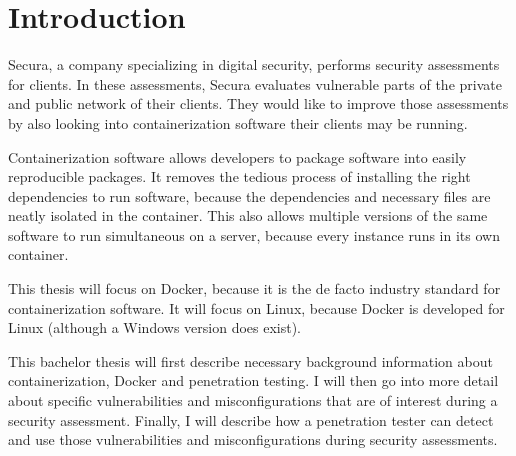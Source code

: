 \chapter{Introduction}
Secura, a company specializing in digital security, performs security assessments for clients. In these assessments, Secura evaluates vulnerable parts of the private and public network of their clients. They would like to improve those assessments by also looking into containerization software their clients may be running.

\hfill

Containerization software allows developers to package software into easily reproducible packages.
It removes the tedious process of installing the right dependencies to run software, because the dependencies and necessary files are neatly isolated in the container. This also allows multiple versions of the same software to run simultaneous on a server, because every instance runs in its own container.

\hfill

This thesis will focus on Docker, because it is the de facto industry standard for containerization software. It will focus on Linux, because Docker is developed for Linux (although a Windows version does exist).

\hfill

This bachelor thesis will first describe necessary background information about containerization, Docker and penetration testing. I will then go into more detail about specific vulnerabilities and misconfigurations that are of interest during a security assessment. Finally, I will describe how a penetration tester can detect and use those vulnerabilities and misconfigurations during security assessments.

